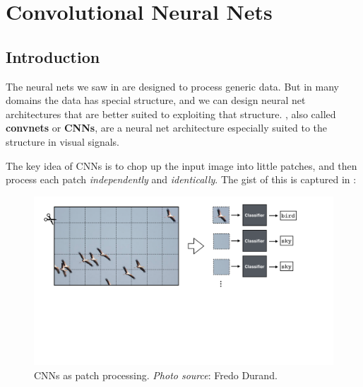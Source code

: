\chapter{Convolutional Neural Nets}
\label{chapter:convolutional_neural_nets}

\section{Introduction}

The neural nets we saw in \chap{\ref{chapter:neural_nets}} are designed to process generic data. But in many domains the data has special structure, and we can design neural net architectures that are better suited to exploiting that structure. , also called {\bf convnets} or {\bf CNNs}, are a neural net architecture especially suited to the structure in visual signals.



The key idea of CNNs is to chop up the input image into little patches, and then process each patch \textit{independently} and \textit{identically}. The gist of this is captured in \fig{\ref{fig:convolutional_neural_nets:CNNs_as_patch_processing}}:
\vspace{-0.2cm}
\begin{figure}[h]
\centerline{
    \includegraphics[width=0.95\linewidth]{./figures/convolutional_neural_nets/CNNs_as_patch_processing.pdf}}
    \caption{CNNs as patch processing. {\em Photo source}: Fredo Durand.}
    \label{fig:convolutional_neural_nets:CNNs_as_patch_processing}
\end{figure}
\vspace{-0.2cm}

